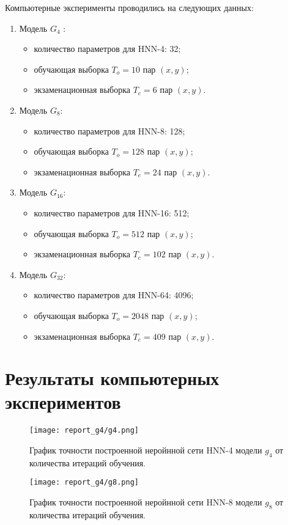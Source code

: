 \documentclass[a4paper,12pt,twoside]{article}
\begin{document}
	\bigskip
	\noindent Компьютерные эксперименты проводились на следующих данных:
	\begin{enumerate}
		\item Модель $G_4$ :
		\begin{itemize}
		\item количество параметров для HNN-4: 32; 
		\item обучающая выборка $T_o=10$ пар $(x, y)$;
		\item экзаменационная выборка $T_e=6$ пар $(x, y)$.
		\end{itemize}
	
		\item Модель $G_8$:
		\begin{itemize}
			\item количество параметров для HNN-8: 128; 
			\item обучающая выборка $T_o=128$ пар $(x, y)$;
			\item экзаменационная выборка $T_e=24$ пар $(x, y)$.
		\end{itemize}
	
		\item Модель $G_{16}$:
		\begin{itemize}
			\item количество параметров для HNN-16: 512; 
			\item обучающая выборка $T_o=512$ пар $(x, y)$;
			\item экзаменационная выборка $T_e=102$ пар $(x, y)$.
		\end{itemize}
		
		\item Модель $G_{32}$:
		\begin{itemize}
			\item количество параметров для HNN-64: 4096; 
			\item обучающая выборка $T_o=2048$ пар $(x, y)$;
			\item экзаменационная выборка $T_e=409$ пар $(x, y)$.
		\end{itemize}
	\end{enumerate}
	
	
	\newpage
	\section{Результаты компьютерных экспериментов}
	
	\begin{figure}[htb!]
	\texttt{[image: report\_g4/g4.png]}
	
	График точности построенной неройнной сети HNN-4 модели $g_4$ от количества итераций обучения.
		
	\end{figure}
	\begin{figure}[htb!]
	\texttt{[image: report\_g4/g8.png]}
	
	График точности построенной неройнной сети HNN-8 модели $g_8$ от количества итераций обучения.
	
	\end{figure}
\end{document}
